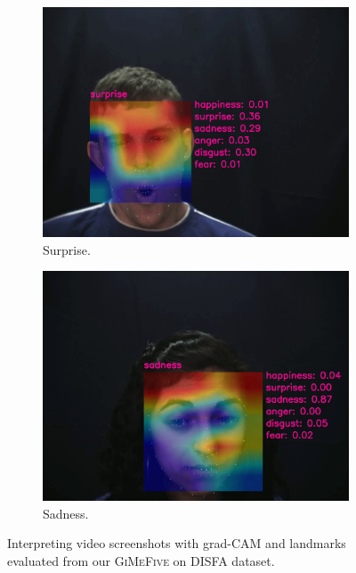\begin{figure}[ht]
\begin{subfigure}{0.49\linewidth}
    \includegraphics[width=\linewidth]{GiMeFive03.png}
    \caption{Surprise.}
    \label{fig:v3}
  \end{subfigure}
  \hfill
  \begin{subfigure}{0.49\linewidth}
    \includegraphics[width=\linewidth]{GiMeFive04.png}
    \caption{Sadness.}
    \label{fig:v4}
  \end{subfigure}
  \caption{Interpreting video screenshots with grad-CAM and landmarks evaluated from our \textsc{GiMeFive} on DISFA dataset.}
  \label{fig:video}
\end{figure}

